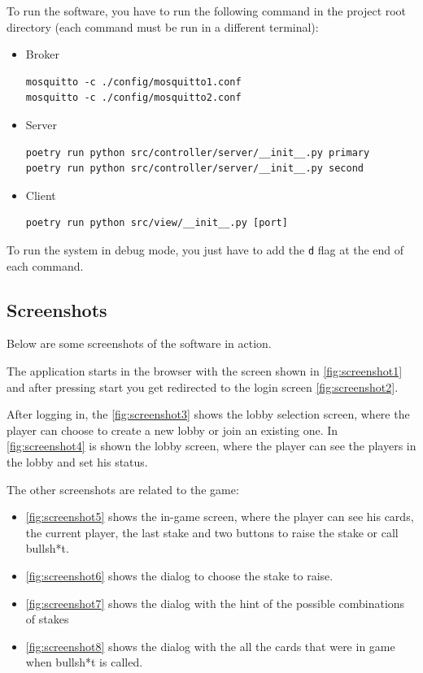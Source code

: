 \documentclass{scrartcl}
\begin{document}
To run the software, you have to run the following command in the project root directory 
(each command must be run in a different terminal):
\begin{itemize}
      \item Broker
            \begin{verbatim}
mosquitto -c ./config/mosquitto1.conf
mosquitto -c ./config/mosquitto2.conf
            \end{verbatim}
      \item Server
            \begin{verbatim}
poetry run python src/controller/server/__init__.py primary
poetry run python src/controller/server/__init__.py second
            \end{verbatim}
      \item Client
            \begin{verbatim}
poetry run python src/view/__init__.py [port]
            \end{verbatim}
\end{itemize}
To run the system in debug mode, you just have to add the \texttt{d} flag at the end of each command.

\subsection{Screenshots}\label{screenshots}
Below are some screenshots of the software in action.

The application starts in the browser with the screen shown in \cref{fig:screenshot1}
and after pressing start you get redirected to the login screen \cref{fig:screenshot2}.

After logging in, the \cref{fig:screenshot3} shows the lobby selection screen, where the player can 
choose to create a new lobby or join an existing one. In \cref{fig:screenshot4} is shown the 
lobby screen, where the player can see the players in the lobby and set his status.

The other screenshots are related to the game:
\begin{itemize}
      \item \cref{fig:screenshot5} shows the in-game screen, where the player can see his cards, the 
            current player, the last stake and two buttons to raise the stake or call bullsh*t.
      \item \cref{fig:screenshot6} shows the dialog to choose the stake to raise.
      \item \cref{fig:screenshot7} shows the dialog with the hint of the possible combinations of 
            stakes
      \item \cref{fig:screenshot8} shows the dialog with the all the cards that were in game 
            when bullsh*t is called.
\end{itemize}
\end{document}
